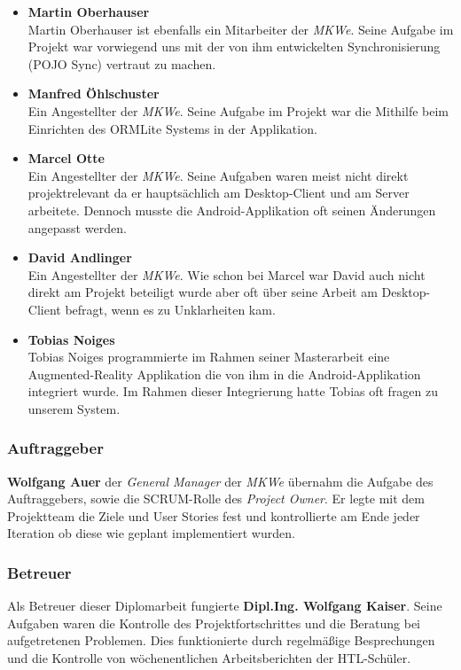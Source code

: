 \begin{itemize}
\item \textbf{Martin Oberhauser}\\
Martin Oberhauser ist ebenfalls ein Mitarbeiter der \textit{MKWe}. Seine Aufgabe im Projekt war vorwiegend uns mit der von ihm entwickelten Synchronisierung (POJO Sync) vertraut zu machen.
     
\item \textbf{Manfred Öhlschuster}\\
Ein Angestellter der \textit{MKWe}. Seine Aufgabe im Projekt war die Mithilfe beim Einrichten des ORMLite Systems in der Applikation.     
     
\item \textbf{Marcel Otte}\\   
Ein Angestellter der \textit{MKWe}. Seine Aufgaben waren meist nicht direkt projektrelevant da er hauptsächlich am Desktop-Client und am Server arbeitete. Dennoch musste die Android-Applikation oft seinen Änderungen angepasst werden. 
     
\item \textbf{David Andlinger}\\
Ein Angestellter der \textit{MKWe}. Wie schon bei Marcel war David auch nicht direkt am Projekt beteiligt wurde aber oft über seine Arbeit am Desktop-Client befragt, wenn es zu Unklarheiten kam.

\item \textbf{Tobias Noiges}\\
Tobias Noiges programmierte im Rahmen seiner Masterarbeit eine Augmented-Reality Applikation die von ihm in die Android-Applikation integriert wurde. Im Rahmen dieser Integrierung hatte Tobias oft fragen zu unserem System.

\end{itemize}
   
\subsubsection{Auftraggeber}
\textbf{Wolfgang Auer} der \textit{General Manager} der \textit{MKWe} übernahm die Aufgabe des Auftraggebers, sowie die SCRUM-Rolle des \textit{Project Owner}. Er legte mit dem Projektteam die Ziele und User Stories fest und kontrollierte am Ende jeder Iteration ob diese wie geplant implementiert wurden.

\subsubsection{Betreuer}
Als Betreuer dieser Diplomarbeit fungierte \textbf{Dipl.Ing. Wolfgang Kaiser}. Seine Aufgaben waren die Kontrolle des Projektfortschrittes und die Beratung bei aufgetretenen Problemen. Dies funktionierte durch regelmäßige Besprechungen und die Kontrolle von wöchenentlichen Arbeitsberichten der HTL-Schüler.

